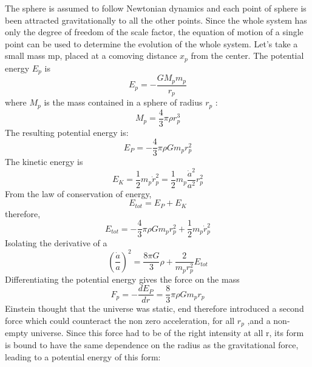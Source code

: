 \documentclass[14pt]{extarticle}
\begin{document}
The sphere is assumed to follow Newtonian dynamics and each point of sphere is been attracted gravitationally to all the other points. Since the whole system has only the degree of freedom of the scale factor, the
equation of motion of a single point can be used to determine the evolution of the whole system. Let’s take a small mass mp, placed at a comoving distance $x_{p}$ from the center. The potential energy $E_{p}$ is\\
\begin{equation*}
E_{p}=-\frac{G M_{p} m_{p}}{r_{p}}
\end{equation*}
where $M_{p}$ is the mass contained in a sphere of radius $r_{p}$ :\\
\begin{equation*}
M_{p}=\frac{4}{3} \pi \rho r_{p}^{3}
\end{equation*}
The resulting potential energy is: \\
\begin{equation*}
E_{P}=-\frac{4}{3} \pi \rho G m_{p} r_{p}^{2}
\end{equation*}
The kinetic energy is \\
\begin{equation*}
E_{K}=\frac{1}{2} m_{p} \dot{r}_{p}^{2}=\frac{1}{2} m_{p} \frac{\dot{a}^{2}}{a^{2}} r_{p}^{2}
\end{equation*} 
From the law of conservation of energy,\\
\begin{equation*}
E_{t o t}=E_{P}+E_{K}
\end{equation*}
therefore,\\
\begin{equation*}
E_{t o t}=-\frac{4}{3} \pi \rho G m_{p} r_{p}^{2}+\frac{1}{2} m_{p} \dot{r}_{p}^{2}
\end{equation*}
Isolating the derivative of a\\
\begin{equation}
\left(\frac{\dot{a}}{a}\right)^{2}=\frac{8 \pi G}{3} \rho+\frac{2}{m_{p} r_{p}^{2}} E_{t o t}
\end{equation}
Differentiating the potential energy gives the force on the mass \\
\begin{equation}
F_{p}=-\frac{d E_{P}}{d r}=\frac{8}{3} \pi \rho G m_{p} r_{p}
\end{equation}
Einstein thought that the universe
was static, end therefore introduced a second force which could counteract the non
zero acceleration, for all $r_{p}$ ,and a non-empty universe. Since this force had to be of the right intensity at all r, its form is bound to have the same dependence on the radius as the gravitational force, leading to a potential energy of this form: \\
\end{document}
